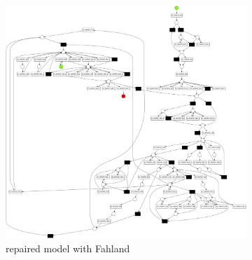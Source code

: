 \begin{figure}[htp]
	\centering
	\begin{subfigure}[b]{0.55\textwidth}
		\centering
		\includegraphics[width=1.0\textwidth, height=0.9\textheight]{figures/evaluation/PN-result-D4-3-M3-fahland-new.pdf}
		\caption{repaired model with Fahland}
		\label{fig:rl_fahland}
	\end{subfigure}%
	\begin{subfigure}[b]{0.43\textwidth}
		\centering

\end{subfigure}
\end{figure}
